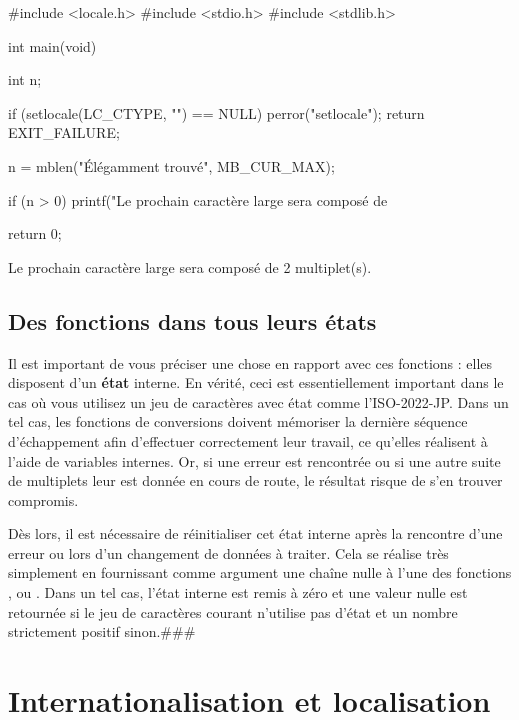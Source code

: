 \begin{C}
#include <locale.h>
#include <stdio.h>
#include <stdlib.h>


int
main(void)
{
    int n;

    if (setlocale(LC_CTYPE, "") == NULL)
    {
        perror("setlocale");
        return EXIT_FAILURE;
    }

    n = mblen("Élégamment trouvé", MB_CUR_MAX);

    if (n > 0)
        printf("Le prochain caractère large sera composé de %

    return 0;
}
\end{C}

\begin{C}
Le prochain caractère large sera composé de 2 multiplet(s).
\end{C}

\subsection{Des fonctions dans tous leurs états}
\label{des-fonctions-dans-tous-leurs-etats}

Il est important de vous préciser une chose en rapport avec ces
fonctions : elles disposent d'un \textbf{état} interne. En vérité, ceci
est essentiellement important dans le cas où vous utilisez un jeu de
caractères avec état comme l'ISO-2022-JP. Dans un tel cas, les fonctions
de conversions doivent mémoriser la dernière séquence d'échappement afin
d'effectuer correctement leur travail, ce qu'elles réalisent à l'aide de
variables internes. Or, si une erreur est rencontrée ou si une autre
suite de multiplets leur est donnée en cours de route, le résultat
risque de s'en trouver compromis.

Dès lors, il est nécessaire de réinitialiser cet état interne après la
rencontre d'une erreur ou lors d'un changement de données à traiter.
Cela se réalise très simplement en fournissant comme argument une chaîne
nulle à l'une des fonctions ,  ou
. Dans un tel cas, l'état interne est remis à zéro et
une valeur nulle est retournée si le jeu de caractères courant n'utilise
pas d'état et un nombre strictement positif sinon.\#\#\# 

\section{Internationalisation et localisation}
\label{internationalisation-et-localisation}

